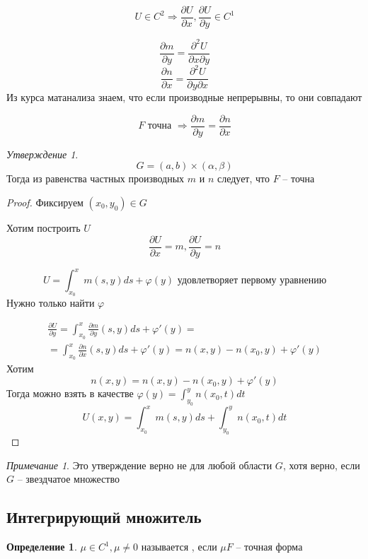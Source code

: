 \documentclass[a4paper]{article}
\theoremstyle{indented}
\theoremstyle{definition}
\newtheorem*{defn}{Определение}
\theoremstyle{remark}
\newtheorem*{remark}{Примечание}
\newtheorem*{stat}{Утверждение}
\begin{document}
\[U \in C^2 \Rightarrow \frac{\partial U}{\partial x}, \frac{\partial U}{\partial y} \in C^1\]

\[\frac{\partial m}{\partial y} = \frac{\partial^2 U}{\partial x \partial y}\]
\[\frac{\partial n}{\partial x} = \frac{\partial^2 U}{\partial y\partial x}\]
Из курса матанализа знаем, что если производные непрерывны, то они совпадают

\[F \text{ точна } \Rightarrow \frac{\partial m}{\partial y} = \frac{\partial n}{\partial x}\]

\begin{stat}
  \[G = (a,b) \times (\alpha, \beta)\]
  Тогда из равенства частных производных $m$ и $n$ следует, что $F$ -- точна
\end{stat}
\begin{proof}
  Фиксируем $(x_0,y_0) \in G$

  Хотим построить $U$
  \[\frac{\partial U}{\partial x} = m, \frac{\partial U}{\partial y} = n \]

  \[U = \int_{x_0}^{x}m(s,y)ds + \varphi (y) \text{ удовлетворяет первому уравнению}\]
  Нужно только найти $\varphi $

  \begin{equation*}
    \begin{gathered}
      \frac{\partial U}{\partial y} = \int_{x_0}^{x}\frac{\partial m}{\partial y}(s,y) ds + \varphi' (y) =
      \\
     =  \int_{x_0}^{x} \frac{\partial n}{\partial x}(s,y) ds + \varphi'(y) = n(x,y) - n(x_0,y) + \varphi'(y)
    \end{gathered}
  \end{equation*}
  Хотим
  \[n(x,y) = n(x,y) - n(x_0,y) + \varphi'(y)\]
  Тогда можно взять в качестве $\varphi(y) = \int_{y_0}^{y}n(x_0,t)dt$
  \[U(x,y) = \int_{x_0}^{x}m(s,y)ds + \int_{y_0}^{y}n(x_0,t)dt\]
\end{proof}
\begin{remark}
  Это утверждение верно не для любой области $G$, хотя верно, если $G$ -- звездчатое множество
\end{remark}


\subsection{Интегрирующий множитель}
\begin{defn}
  $\mu \in C^1, \mu \neq 0$ называется , если $\mu F$ -- точная форма
\end{defn}
\end{document}
